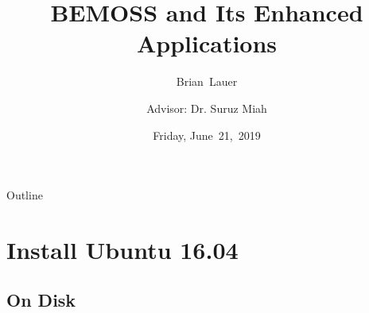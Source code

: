 \documentclass{beamer}
\title[BEMOSS Installation]{BEMOSS and Its Enhanced Applications}
\author[B.~Lauer]{Brian~Lauer \\\and
Advisor: Dr. Suruz Miah}
\institute[Bradley University] %
{
  Department of Electrical and Computer Engineering\\
  Bradley University\\
  1501 W. Bradley Avenue\\
  Peoria, IL, 61625, USA
}
\date[June~21,~2019]{Friday, June~21,~2019}
\begin{document}
\begin{frame}
  \titlepage
\end{frame}

\begin{frame}{Outline}
  \tableofcontents
\end{frame}


\section{Install Ubuntu 16.04}
\subsection{On Disk}
\end{document}
